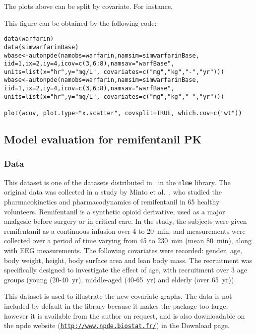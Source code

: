 \hskip 18pt The plots above can be split by covariate. For instance, 


This figure can be obtained by the following code:
\begin{verbatim}
data(warfarin)
data(simwarfarinBase)
wbase<-autonpde(namobs=warfarin,namsim=simwarfarinBase, iid=1,ix=2,iy=4,icov=c(3,6:8),namsav="warfBase", units=list(x="hr",y="mg/L", covariates=c("mg","kg","-","yr")))
wbase<-autonpde(namobs=warfarin,namsim=simwarfarinBase, iid=1,ix=2,iy=4,icov=c(3,6:8),namsav="warfBase", units=list(x="hr",y="mg/L", covariates=c("mg","kg","-","yr")))

plot(wcov, plot.type="x.scatter", covsplit=TRUE, which.cov=c("wt"))
\end{verbatim} 


\clearpage
\subsection{Model evaluation for remifentanil PK} \label{sec:remifentanil}

\subsubsection{Data}

\hskip 18pt This dataset is one of the datasets distributed in \R~in the \texttt{nlme} library. The original data was collected in a study by Minto et al.~\cite{Minto97a,Minto97b}, who studied the pharmacokinetics and pharmacodynamics of remifentanil in 65 healthy volunteers. Remifentanil is a synthetic opioid derivative, used as a major analgesic before surgery or in critical care. In the study, the subjects were given remifentanil as a continuous infusion over 4 to 20~min, and measurements were collected over a period of time varying from 45 to 230~min (mean 80~min), along with EEG measurements. The following covariates were recorded: gender, age, body weight, height, body surface area and lean body mass. The recruitment was specifically designed to investigate the effect of age, with recruitment over 3 age groups (young (20-40~yr), middle-aged (40-65~yr) and elderly (over 65~yr)).

This dataset is used to illustrate the new covariate graphs. The data is not included by default in the library because it makes the package too large, however it is available from the author on request, and is also downloadable on the npde website (\href{http://www.npde.biostat.fr/}{\texttt{http://www.npde.biostat.fr/}}) in the Download page.

